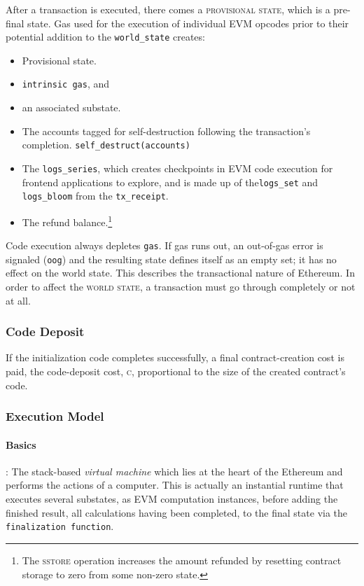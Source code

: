 \documentclass[10pt,letterpaper,leqno,bibliography=totoc]{scrartcl}
\newenvironment{alphafootnotes}
{\par\edef\savedfootnotenumber{\number\value{footnote}}
\renewcommand{\thefootnote}{\alph{footnote}}
\setcounter{footnote}{0}}
{\par\setcounter{footnote}{\savedfootnotenumber}}
\begin{document}
\begin{alphafootnotes}
\begin{multicols*}{2}
			After a transaction is executed, there comes a \textsc{provisional state}, which is a pre-final state. Gas used for the execution of individual EVM opcodes prior to their potential addition to the \texttt{world\_state} creates:
			
		\begin{itemize}
			\item Provisional state.
			\item \texttt{intrinsic gas}, and
			\item an associated substate.  
		\end{itemize}
		
		\begin{itemize}
        		\item The accounts tagged for self-destruction following the transaction's completion. \texttt{self\_destruct(accounts)}
        		\item The \texttt{logs\_series}, which creates checkpoints in EVM code execution for frontend applications to explore, and is made up of the\texttt{logs\_set} and \texttt{logs\_bloom} from the \texttt{tx\_receipt}.
			\item The refund balance.\footnote{The \textsc{sstore} operation increases the amount refunded by resetting contract storage to zero from some non-zero state.}
		\end{itemize}

		Code execution always depletes \texttt{gas}. If gas runs out, an out-of-gas error is signaled (\texttt{oog}) and the resulting state defines itself as an empty set; it has no effect on the world state. This describes the transactional nature of Ethereum. In order to affect the \textsc{world state}, a transaction must go through completely or not at all. 

				\subsubsection{Code Deposit}
				If the initialization code completes successfully, a final contract-creation cost is paid, the code-deposit cost, \textsc{c}, proportional to the size of the created contract's code. 
	
				\subsubsection{Execution Model}
				\paragraph{Basics}: The stack-based \textsl{virtual machine} which lies at the heart of the Ethereum and performs the actions of a computer. This is actually an instantial runtime that executes several substates, as EVM computation instances, before adding the finished result, all calculations having been completed, to the final state  via the \texttt{finalization function}. 
	

\end{multicols*}
\end{alphafootnotes}
\end{document}
